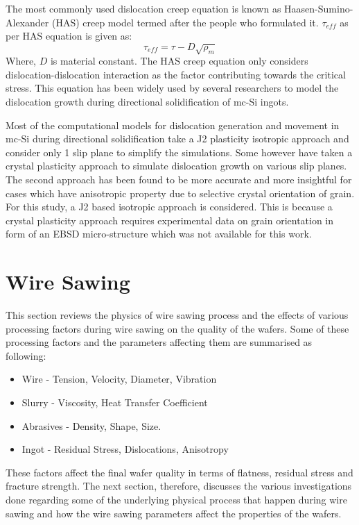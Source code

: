 The most commonly used dislocation creep equation is known as Haasen-Sumino-Alexander (HAS) creep model \cite{miyazaki2007dislocation,haasen1962plastischen} termed after the people who formulated it. $\tau_{eff}$ as per HAS equation is given as:
\begin{equation}
   \tau_{eff} = \tau -  D\sqrt{\rho_{m}} \label{has-creep}
\end{equation}
Where, $D$ is material constant. The HAS creep equation only considers dislocation-dislocation interaction as the factor contributing towards the critical stress. This equation has been widely used by several researchers \cite{} to model the dislocation growth during directional solidification of mc-Si ingots.

Most of the computational models for dislocation generation and movement in mc-Si during directional solidification \cite{} take a J2 plasticity isotropic approach and consider only 1 slip plane to simplify the simulations. Some however \cite{} have taken a crystal plasticity approach to simulate dislocation growth on various slip planes. The second approach has been found to be more accurate \cite{} and more insightful for cases which have anisotropic property due to selective crystal orientation of grain.  For this study, a J2 based isotropic approach is considered. This is because a crystal plasticity approach requires experimental data on grain orientation in form of an EBSD micro-structure \cite{CPFEM} which was not available for this work. 


\section{Wire Sawing}
This section reviews the physics of wire sawing process and the effects of various processing factors during wire sawing on the quality of the wafers. Some of these processing factors and the parameters affecting them are summarised as following:
\begin{itemize}
\item
Wire - Tension, Velocity, Diameter, Vibration
\item
Slurry - Viscosity, Heat Transfer Coefficient
\item
Abrasives - Density, Shape, Size.
\item
Ingot - Residual Stress, Dislocations, Anisotropy
\end{itemize}


These factors affect the final wafer quality in terms of flatness, residual stress and fracture strength. The next section, therefore, discusses the various investigations done regarding some of the underlying physical process that happen during wire sawing and how the wire sawing parameters affect the properties of the wafers.

